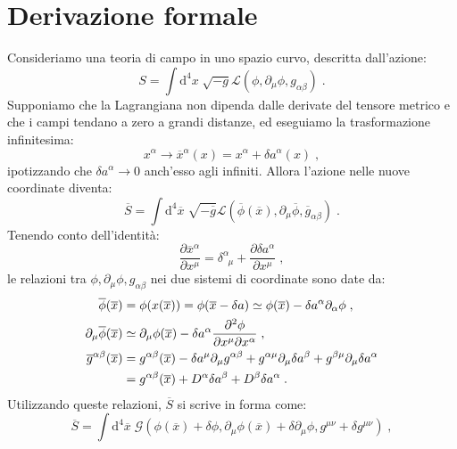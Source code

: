\documentclass[12pt,a4paper]{report}
\theoremstyle{definition}
\newcommand{\lag}{\mathcal{L}}
\newcommand{\diff}[1][]{\mathrm{d}#1}
\begin{document}
\section{Derivazione formale}
Consideriamo una teoria di campo in uno spazio curvo, descritta dall'azione:
\begin{equation}
S=\int \diff^4{x}\;\sqrt{-g}\lag(\phi,\partial_{\mu}\phi,g_{\alpha\beta})\;. \label{ch3_action}
\end{equation}
Supponiamo che la Lagrangiana non dipenda dalle derivate del tensore metrico e che i campi tendano a zero a grandi distanze, ed eseguiamo la trasformazione infinitesima:
\begin{equation}
x^{\alpha}\longrightarrow \overline{x}^{\alpha}(x)=x^{\alpha}+\delta a^{\alpha}(x)\;,
\end{equation}
ipotizzando che $\delta a^{\alpha}\to 0$ anch'esso agli infiniti. Allora l'azione nelle nuove coordinate diventa:
$$
\overline{S}=\int\diff^4{\overline{x}}\;\sqrt{-\overline{g}}\lag(\overline{\phi}(\overline{x}),\partial_{\mu}\overline{\phi},\overline{g}_{\alpha\beta})\;.
$$
Tenendo conto dell'identità:
\begin{equation}
\frac{\partial\overline{x}^{\alpha}}{\partial x^{\mu}}=\delta^{\alpha}_{\;\;\mu}+\frac{\partial\delta a^{\alpha}}{\partial x^{\mu}}\;,
\end{equation}
le relazioni tra $\phi,\partial_{\mu}\phi,g_{\alpha\beta}$ nei due sistemi di coordinate sono date da:
\begin{align}
\overline{\phi}(\overline{x}) &= \phi(x(\overline{x}))=\phi(\overline{x}-\delta a)\simeq \phi(\overline{x})-\delta a^{\alpha}\partial_{\alpha}\phi\;, \\
\partial_{\mu}\overline{\phi}(\overline{x}) &\simeq \partial_{\mu}\phi(\overline{x})-\delta a^{\alpha}\frac{\partial^2\phi}{\partial x^{\mu}\partial x^{\alpha}}\;, \\
\overline{g}^{\alpha\beta}(\overline{x}) &= g^{\alpha\beta}(\overline{x})-\delta a^{\mu}\partial_{\mu}g^{\alpha\beta}+g^{\alpha\mu}\partial_{\mu}\delta a^{\beta}+g^{\beta\mu}\partial_{\mu}\delta a^{\alpha} \notag \\
&= g^{\alpha\beta}(\overline{x})+D^{\alpha}\delta a^{\beta}+D^{\beta}\delta a^{\alpha}\;. \label{ch3_vargmunu}
\end{align}
Utilizzando queste relazioni, $\overline{S}$ si scrive in forma come:
\begin{equation}
\overline{S}=\int\diff^4{\overline{x}}\; \mathcal{G}(\phi(\overline{x})+\delta\phi,\partial_{\mu}\phi(\overline{x})+\delta\partial_{\mu}\phi,g^{\mu\nu}+\delta g^{\mu\nu})\;,
\end{equation}
\end{document}
